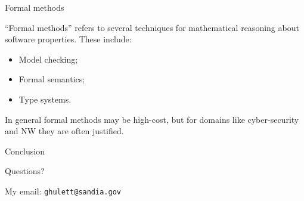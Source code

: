 \documentclass{beamer}
\begin{document}
\begin{frame}{Formal methods}

``Formal methods'' refers to several techniques for mathematical reasoning
about software properties. These include:

\begin{itemize}
  \item Model checking;
  \item Formal semantics;
  \item Type systems.
\end{itemize}

In general formal methods may be high-cost, but for domains like
cyber-security and NW they are often justified.

\end{frame}


\begin{frame}{Conclusion}

Questions?

My email: \texttt{ghulett@sandia.gov}

\end{frame}
\end{document}
